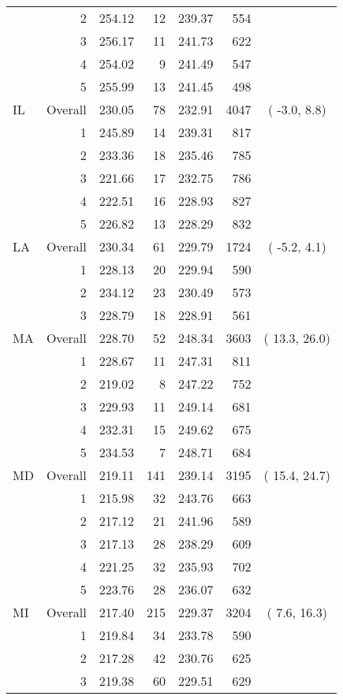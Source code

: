 \begin{longtable}{lrrr@{\extracolsep{.25cm}}rrc}
   & 2 & 254.12 &  12 & 239.37 & 554 &  \\ 
   & 3 & 256.17 &  11 & 241.73 & 622 &  \\ 
   & 4 & 254.02 &   9 & 241.49 & 547 &  \\ 
   & 5 & 255.99 &  13 & 241.45 & 498 &  \\ 
   \hline
IL & Overall & 230.05 &  78 & 232.91 & 4047 & ( -3.0,  8.8) \\ 
   & 1 & 245.89 &  14 & 239.31 & 817 &  \\ 
   & 2 & 233.36 &  18 & 235.46 & 785 &  \\ 
   & 3 & 221.66 &  17 & 232.75 & 786 &  \\ 
   & 4 & 222.51 &  16 & 228.93 & 827 &  \\ 
   & 5 & 226.82 &  13 & 228.29 & 832 &  \\ 
   \hline
LA & Overall & 230.34 &  61 & 229.79 & 1724 & ( -5.2,  4.1) \\ 
   & 1 & 228.13 &  20 & 229.94 & 590 &  \\ 
   & 2 & 234.12 &  23 & 230.49 & 573 &  \\ 
   & 3 & 228.79 &  18 & 228.91 & 561 &  \\ 
   \hline
MA & Overall & 228.70 &  52 & 248.34 & 3603 & ( 13.3, 26.0) \\ 
   & 1 & 228.67 &  11 & 247.31 & 811 &  \\ 
   & 2 & 219.02 &   8 & 247.22 & 752 &  \\ 
   & 3 & 229.93 &  11 & 249.14 & 681 &  \\ 
   & 4 & 232.31 &  15 & 249.62 & 675 &  \\ 
   & 5 & 234.53 &   7 & 248.71 & 684 &  \\ 
   \hline
MD & Overall & 219.11 & 141 & 239.14 & 3195 & ( 15.4, 24.7) \\ 
   & 1 & 215.98 &  32 & 243.76 & 663 &  \\ 
   & 2 & 217.12 &  21 & 241.96 & 589 &  \\ 
   & 3 & 217.13 &  28 & 238.29 & 609 &  \\ 
   & 4 & 221.25 &  32 & 235.93 & 702 &  \\ 
   & 5 & 223.76 &  28 & 236.07 & 632 &  \\ 
   \hline
MI & Overall & 217.40 & 215 & 229.37 & 3204 & (  7.6, 16.3) \\ 
   & 1 & 219.84 &  34 & 233.78 & 590 &  \\ 
   & 2 & 217.28 &  42 & 230.76 & 625 &  \\ 
   & 3 & 219.38 &  60 & 229.51 & 629 &  \\ 

\end{longtable}

